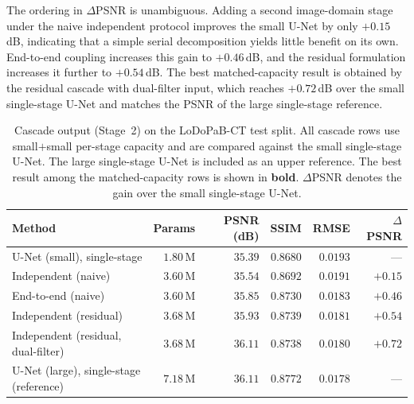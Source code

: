 The ordering in $\Delta$PSNR is unambiguous. Adding a second image-domain stage under the naive independent protocol improves the small U-Net by only $+0.15$\,dB, indicating that a simple serial decomposition yields little benefit on its own. End-to-end coupling increases this gain to $+0.46$\,dB, and the residual formulation increases it further to $+0.54$\,dB. The best matched-capacity result is obtained by the residual cascade with dual-filter input, which reaches $+0.72$\,dB over the small single-stage U-Net and matches the PSNR of the large single-stage reference.

\begin{table}[!htb]
    \centering
    \caption[Cascade comparison at matched per-stage capacity.]{%
        Cascade output (Stage~2) on the LoDoPaB-CT test split. All cascade
        rows use small$+$small per-stage capacity and are compared against
        the small single-stage U-Net. The large single-stage U-Net is
        included as an upper reference. The best result among the
        matched-capacity rows is shown in \textbf{bold}. $\Delta$PSNR denotes
        the gain over the small single-stage U-Net.}
    \label{tab:exp_cascade}
    \setlength{\tabcolsep}{6pt}
    \small
    \begin{tabular}{@{}l r r r r r@{}}
        \toprule
        Method                                     & Params      & PSNR (dB) & SSIM     & RMSE    & $\Delta$PSNR \\
        \midrule
        U-Net (small), single-stage                & $1.80$\,M   & $35.39$   & $0.8680$ & $0.0193$ & --- \\
        \quad Independent (naive)                  & $3.60$\,M   & $35.54$   & $0.8692$ & $0.0191$ & $+0.15$ \\
        \quad End-to-end (naive)                   & $3.60$\,M   & $35.85$   & $0.8730$ & $0.0183$ & $+0.46$ \\
        \quad Independent (residual)               & $3.68$\,M   & $35.93$   & $0.8739$ & $0.0181$ & $+0.54$ \\
        \quad Independent (residual, dual-filter)  & $3.68$\,M   & $\mathbf{36.11}$ & $\mathbf{0.8738}$ & $\mathbf{0.0180}$ & $\mathbf{+0.72}$ \\
        \midrule
        U-Net (large), single-stage (reference)    & $7.18$\,M   & $36.11$   & $0.8772$ & $0.0178$ & --- \\
        \bottomrule
    \end{tabular}
\end{table}

